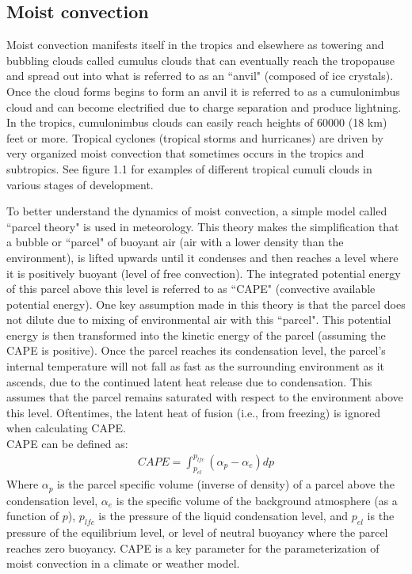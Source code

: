 \documentclass[letterpaper,12pt,titlepage,oneside,final]{book}
\begin{document}
\subsection{Moist convection}

Moist convection manifests itself in the tropics and elsewhere as towering and bubbling clouds called cumulus clouds that can eventually reach the tropopause and spread out into what is referred to as an ``anvil" (composed of ice crystals). Once the cloud forms begins to form an anvil it is referred to as a cumulonimbus cloud and can become electrified due to charge separation and produce lightning. In the tropics, cumulonimbus clouds can easily reach heights of 60000 (18 km) feet or more. Tropical cyclones (tropical storms and hurricanes) are driven by very organized moist convection that sometimes occurs in the tropics and subtropics. See figure 1.1 for examples of different tropical cumuli clouds in various stages of development.

To better understand the dynamics of moist convection, a simple model called ``parcel theory" is used in meteorology. This theory makes the simplification that a bubble or ``parcel" of buoyant air (air with a lower density than the environment), is lifted upwards until it condenses and then reaches a level where it is positively buoyant (level of free convection). The integrated potential energy of this parcel above this level is referred to as ``CAPE" (convective available potential energy). One key assumption made in this theory is that the parcel does not dilute due to mixing of environmental air with this ``parcel". This potential energy is then transformed into the kinetic energy of the parcel (assuming the CAPE is positive). Once the parcel reaches its condensation level, the parcel's internal temperature will not fall as fast as the surrounding environment as it ascends, due to the continued latent heat release due to condensation. This assumes that the parcel remains saturated with respect to the environment above this level. Oftentimes, the latent heat of fusion (i.e., from freezing) is ignored when calculating CAPE.
\\
CAPE can be defined as: 
\begin{align}
CAPE=\int_{p_{el}}^{p_{lfc}}(\alpha_{p}-\alpha_{e}){dp}
\end{align}
Where $\alpha_{p}$ is the parcel specific volume (inverse of density) of a parcel above the condensation level, $\alpha_{e}$ is the specific volume of the background atmosphere (as a function of $p$), $p_{lfc}$ is the pressure of the liquid condensation level, and $p_{el}$ is the pressure of the equilibrium level, or level of neutral buoyancy where the parcel reaches zero buoyancy. CAPE is a key parameter for the parameterization of moist convection in a climate or weather model.
\end{document}
